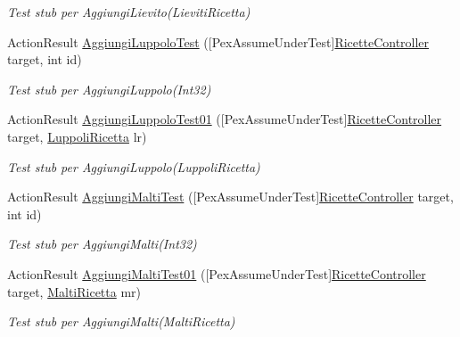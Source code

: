 \begin{DoxyCompactItemize}
\begin{DoxyCompactList}\small\item\em Test stub per Aggiungi\+Lievito(\+Lieviti\+Ricetta)\end{DoxyCompactList}\item 
Action\+Result \mbox{\hyperlink{class_brew_day2_1_1_controllers_1_1_tests_1_1_ricette_controller_test_af96147d7dd56c60b7237da310ba0c75e}{Aggiungi\+Luppolo\+Test}} (\mbox{[}Pex\+Assume\+Under\+Test\mbox{]}\mbox{\hyperlink{class_brew_day2_1_1_controllers_1_1_ricette_controller}{Ricette\+Controller}} target, int id)
\begin{DoxyCompactList}\small\item\em Test stub per Aggiungi\+Luppolo(\+Int32)\end{DoxyCompactList}\item 
Action\+Result \mbox{\hyperlink{class_brew_day2_1_1_controllers_1_1_tests_1_1_ricette_controller_test_a96b379cb8d013527ed23478b72ad1a87}{Aggiungi\+Luppolo\+Test01}} (\mbox{[}Pex\+Assume\+Under\+Test\mbox{]}\mbox{\hyperlink{class_brew_day2_1_1_controllers_1_1_ricette_controller}{Ricette\+Controller}} target, \mbox{\hyperlink{class_brew_day2_1_1_models_1_1_luppoli_ricetta}{Luppoli\+Ricetta}} lr)
\begin{DoxyCompactList}\small\item\em Test stub per Aggiungi\+Luppolo(\+Luppoli\+Ricetta)\end{DoxyCompactList}\item 
Action\+Result \mbox{\hyperlink{class_brew_day2_1_1_controllers_1_1_tests_1_1_ricette_controller_test_a8b45cfffd822dfa3bd8686635a922094}{Aggiungi\+Malti\+Test}} (\mbox{[}Pex\+Assume\+Under\+Test\mbox{]}\mbox{\hyperlink{class_brew_day2_1_1_controllers_1_1_ricette_controller}{Ricette\+Controller}} target, int id)
\begin{DoxyCompactList}\small\item\em Test stub per Aggiungi\+Malti(\+Int32)\end{DoxyCompactList}\item 
Action\+Result \mbox{\hyperlink{class_brew_day2_1_1_controllers_1_1_tests_1_1_ricette_controller_test_aece95122a5931bab2d093a43f60531de}{Aggiungi\+Malti\+Test01}} (\mbox{[}Pex\+Assume\+Under\+Test\mbox{]}\mbox{\hyperlink{class_brew_day2_1_1_controllers_1_1_ricette_controller}{Ricette\+Controller}} target, \mbox{\hyperlink{class_brew_day2_1_1_models_1_1_malti_ricetta}{Malti\+Ricetta}} mr)
\begin{DoxyCompactList}\small\item\em Test stub per Aggiungi\+Malti(\+Malti\+Ricetta)\end{DoxyCompactList}\item 

\end{DoxyCompactItemize}
